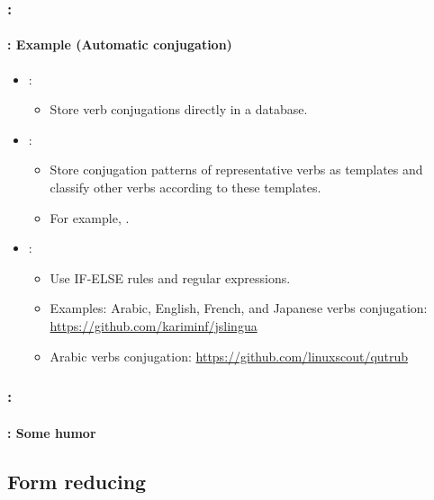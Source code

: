 \documentclass[xcolor=table]{beamer}
\begin{document}
\begin{frame}
	\frametitle{\insertshortsubtitle: \insertsection}
	\framesubtitle{\insertsubsection: Example (Automatic conjugation)}
	
	\begin{itemize}
		\item {}:
		\begin{itemize}
			\item Store verb conjugations directly in a database.
		\end{itemize}
		
		\item {}:
		\begin{itemize}
			\item Store conjugation patterns of representative verbs as templates and classify other verbs according to these templates.
			\item For example, .
		\end{itemize}
		
		\item {}:
		\begin{itemize}
			\item Use IF-ELSE rules and regular expressions.
			\item Examples: Arabic, English, French, and Japanese verbs conjugation: \url{https://github.com/kariminf/jslingua}
			\item Arabic verbs conjugation: \url{https://github.com/linuxscout/qutrub}
		\end{itemize}
	\end{itemize}

\end{frame}

\begin{frame}
	\frametitle{\insertshortsubtitle: \insertsection}
	\framesubtitle{\insertsubsection: Some humor}

	\begin{center}
	\end{center}

\end{frame}

\subsection{Form reducing}
\end{document}
